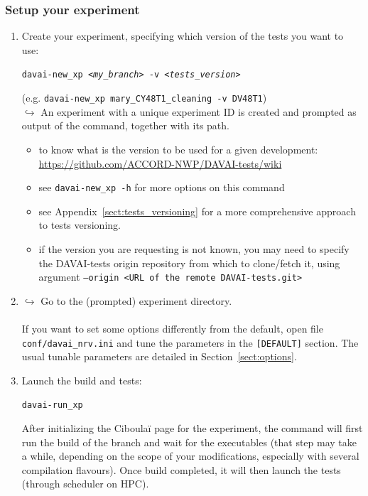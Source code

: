 \documentclass[a4paper,10pt,twoside]{article}
\begin{document}
\subsubsection{Setup your experiment}
\begin{enumerate}[label=(\alph*)]
 \item Create your experiment, specifying which version of the tests you want to use:
 
 \texttt{davai-new\_xp \textit{<my\_branch>} -v \textit{<tests\_version>}}
 
 (e.g. \texttt{davai-new\_xp mary\_CY48T1\_cleaning -v DV48T1})\\
 $\hookrightarrow$ An experiment with a unique experiment ID is created and prompted as output of the command, together with its path. 
 \begin{itemize}
  \item to know what is the version to be used for a given development:\\
  \href{https://github.com/ACCORD-NWP/DAVAI-tests/wiki}{https://github.com/ACCORD-NWP/DAVAI-tests/wiki}
  \item see \texttt{davai-new\_xp -h} for more options on this command
  \item see Appendix~\ref{sect:tests_versioning} for a more comprehensive approach to tests versioning.
 
  \item if the version you are requesting is not known, you may need to specify the DAVAI-tests origin repository from which to clone/fetch it, using argument \texttt{--origin <URL of the remote DAVAI-tests.git>}
 \end{itemize}
 \item $\hookrightarrow$ Go to the (prompted) experiment directory.\\
 \\
 If you want to set some options differently from the default, open file \texttt{conf/davai\_nrv.ini} and tune the parameters in the \texttt{[DEFAULT]} section. The usual tunable parameters are detailed in Section~\ref{sect:options}.
 \item Launch the build and tests:
 
 \texttt{davai-run\_xp}
 
 After initializing the Ciboulaï page for the experiment, the command will first run the build of the branch and wait for the executables (that step may take a while, depending on the scope of your modifications, especially with several compilation flavours). Once build completed, it will then launch the tests (through scheduler on HPC).
\end{enumerate}
\end{document}
